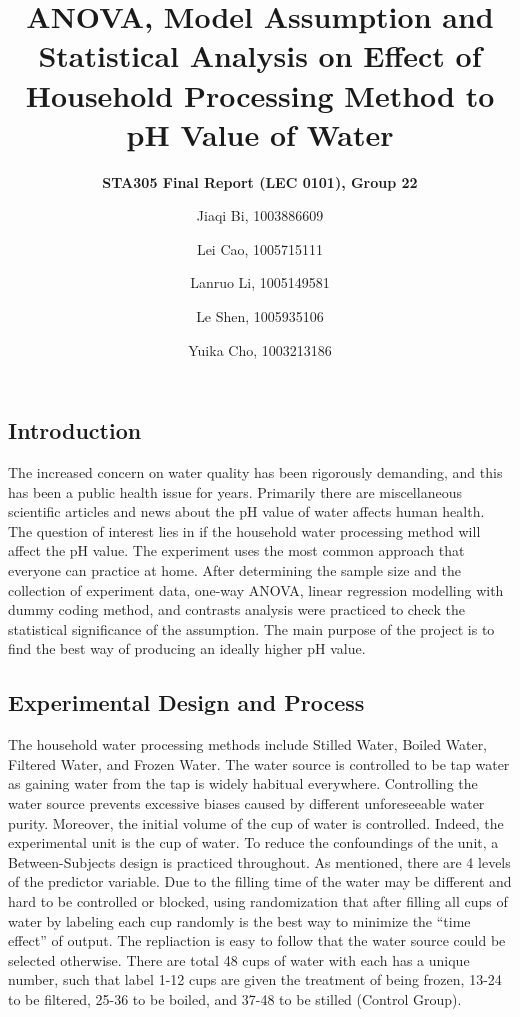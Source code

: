 \documentclass[12pt,]{article}
\title{\textbf{ANOVA, Model Assumption and Statistical Analysis on Effect of
Household Processing Method to pH Value of Water}}
\subtitle{\textbf{STA305 Final Report (LEC 0101), Group 22}}
\author{Jiaqi Bi, 1003886609 \and Lei Cao, 1005715111 \and Lanruo Li, 1005149581 \and Le Shen, 1005935106 \and Yuika Cho, 1003213186}
\date{}
\begin{document}
\maketitle

{
\hypersetup{linkcolor=}
\setcounter{tocdepth}{3}
\tableofcontents
}
\newpage

\hypertarget{introduction}{%
\subsection{Introduction}\label{introduction}}

The increased concern on water quality has been rigorously demanding,
and this has been a public health issue for years. Primarily there are
miscellaneous scientific articles and news about the pH value of water
affects human health. The question of interest lies in if the household
water processing method will affect the pH value. The experiment uses
the most common approach that everyone can practice at home. After
determining the sample size and the collection of experiment data,
one-way ANOVA, linear regression modelling with dummy coding method, and
contrasts analysis were practiced to check the statistical significance
of the assumption. The main purpose of the project is to find the best
way of producing an ideally higher pH value.

\hypertarget{experimental-design-and-process}{%
\subsection{Experimental Design and
Process}\label{experimental-design-and-process}}

The household water processing methods include Stilled Water, Boiled
Water, Filtered Water, and Frozen Water. The water source is controlled
to be tap water as gaining water from the tap is widely habitual
everywhere. Controlling the water source prevents excessive biases
caused by different unforeseeable water purity. Moreover, the initial
volume of the cup of water is controlled. Indeed, the experimental unit
is the cup of water. To reduce the confoundings of the unit, a
Between-Subjects design is practiced throughout. As mentioned, there are
4 levels of the predictor variable. Due to the filling time of the water
may be different and hard to be controlled or blocked, using
randomization that after filling all cups of water by labeling each cup
randomly is the best way to minimize the ``time effect'' of output. The
repliaction is easy to follow that the water source could be selected
otherwise. There are total 48 cups of water with each has a unique
number, such that label 1-12 cups are given the treatment of being
frozen, 13-24 to be filtered, 25-36 to be boiled, and 37-48 to be
stilled (Control Group).
\end{document}
